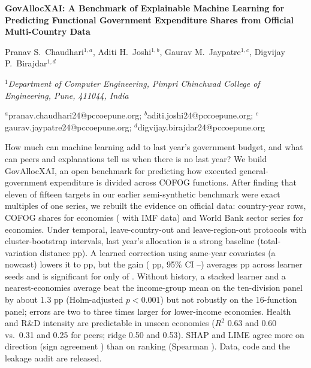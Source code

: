 \documentclass[11pt,a4paper]{article}
\DeclareRobustCommand*{\_}{\textunderscore\hskip0pt\relax}
\begin{document}
\begin{center}
{\LARGE\bfseries GovAllocXAI: A Benchmark of Explainable Machine Learning for Predicting Functional Government Expenditure Shares from Official Multi-Country Data\par}
\vspace{1.2em}
{\large Pranav S.\ Chaudhari$^{1,a}$, Aditi H.\ Joshi$^{1,b}$, Gaurav M.\ Jaypatre$^{1,c}$, Digvijay P.\ Birajdar$^{1,d}$\par}
\vspace{0.8em}
{\small\itshape $^{1}$Department of Computer Engineering, Pimpri Chinchwad College of Engineering, Pune, 411044, India\par}
\vspace{0.5em}
{\small $^{a}$pranav.chaudhari24@pccoepune.org; $^{b}$aditi.joshi24@pccoepune.org; $^{c}$gaurav.jaypatre24@pccoepune.org; $^{d}$digvijay.birajdar24@pccoepune.org\par}
\end{center}
\vspace{0.6em}
\par\vspace{0.4em}
{\small\noindent How much can machine learning add to last year's government budget, and what can peers and explanations tell us when there is no last year? We build GovAllocXAI, an open benchmark for predicting how executed general-government expenditure is divided across COFOG functions. After finding that eleven of fifteen targets in our earlier semi-synthetic benchmark were exact multiples of one series, we rebuilt the evidence on official data: \NMasterRows{} country-year rows, COFOG shares for \NCofogCountries{} economies (\NTenEcon{} with IMF data) and World Bank sector series for \NWdiCountries{} economies. Under temporal, leave-country-out and leave-region-out protocols with cluster-bootstrap intervals, last year's allocation is a strong baseline (total-variation distance \ResTVDPersist{} pp). A learned correction using same-year covariates (a nowcast) lowers it to \ResTVDHyb{} pp, but the gain (\ResPairedGain{} pp, 95\% CI \ResPairedLo--\ResPairedHi) averages \AnnSeedMeanGain{} pp across learner seeds and is significant for only \AnnSeedNExcl{} of \AnnSeedN. Without history, a stacked learner and a nearest-economies average beat the income-group mean on the ten-division panel by about 1.3 pp (Holm-adjusted $p<0.001$) but not robustly on the 16-function panel; errors are two to three times larger for lower-income economies. Health and R\&D intensity are predictable in unseen economies ($R^2$ 0.63 and 0.60 vs.\ 0.31 and 0.25 for peers; ridge 0.50 and 0.53). SHAP and LIME agree more on direction (sign agreement \AgrSignMean) than on ranking (Spearman \AgrRhoMean). Data, code and the leakage audit are released.\par}
\vspace{0.5em}
\vspace{0.8em}
\end{document}
